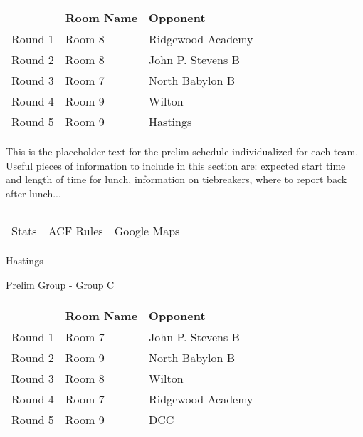 \documentclass{article}%
\begin{document}
\vspace*{4pt}%
\begin{tabularx}{\textwidth}{|c|Y|Y|}%
\hline%
&Room Name&Opponent\\%
\hline%
Round 1&Room 8&Ridgewood Academy\\%
Round 2&Room 8&John P. Stevens B\\%
Round 3&Room 7&North Babylon B\\%
Round 4&Room 9&Wilton\\%
Round 5&Room 9&Hastings\\%
\hline%
\end{tabularx}%
\vspace*{30pt}%
\linebreak%
This is the placeholder text for the prelim schedule individualized for each team. Useful pieces of information to include in this section are: expected start time and length of time for lunch, information on tiebreakers, where to report back after lunch...%
\vspace*{30pt}%
\newline%
%
\begin{tabularx}{\textwidth}{YYY}%
  &  &  \\%
\\%
Stats&ACF Rules&Google Maps\\%
\end{tabularx}%
\newpage%
%
\begin{center}%
\begin{Huge}%
Hastings%
\end{Huge}%
\vspace*{12pt}%
\linebreak%
\begin{Large}%
Prelim Group {-} Group C%
\end{Large}%
\end{center}%
\vspace*{4pt}%
\begin{tabularx}{\textwidth}{|c|Y|Y|}%
\hline%
&Room Name&Opponent\\%
\hline%
Round 1&Room 7&John P. Stevens B\\%
Round 2&Room 9&North Babylon B\\%
Round 3&Room 8&Wilton\\%
Round 4&Room 7&Ridgewood Academy\\%
Round 5&Room 9&DCC\\%
\hline%
\end{tabularx}%
\end{document}
